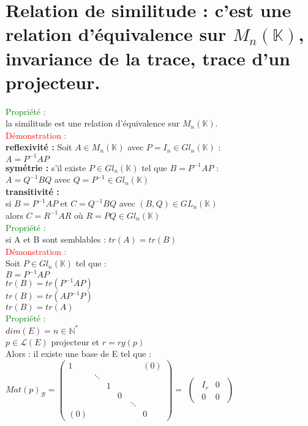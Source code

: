 \documentclass{article}
\begin{document}
        \section{Relation de similitude : c'est une relation d'équivalence sur $M_n( \mathbb K)$, invariance de la trace, trace d'un projecteur.}
				\textcolor{green}{Propriété :} \\
				la similitude est une relation d'équivalence sur $M_n(\mathbb K)$. \\
				\textcolor{red}{Démonstration :} \\
				{\bf reflexivité :} Soit $A \in M_n(\mathbb K)$ avec $P=I_n \in Gl_n(\mathbb K)$ : \\
				$A=P^{-1}A P$ \\
				{\bf symétrie :} s'il existe $P \in Gl_n(\mathbb K)$ tel que $B=P^{-1}A P$ : \\
				 $A=Q^{-1}B Q$ avec $Q=P^{-1} \in Gl_n(\mathbb K)$ \\
				 {\bf transitivité :} \\
				 si $B=P^{-1}AP$ et $C=Q^{-1}BQ$ avec $(B,Q) \in GL_n(\mathbb K)$ \\
				 alors $C=R^{-1}AR$ où $R=PQ \in Gl_n(\mathbb K)$ \\
				 \textcolor{green}{Propriété :} \\
				  si A et B sont semblables : $tr(A)=tr(B)$ \\
				 \textcolor{red}{Démonstration :} \\
				 Soit $P \in Gl_n(\mathbb K)$ tel que : \\
				 $B=P^{-1}A P$ \\
				 $tr(B)=tr(P^{-1}A P)$ \\
				 $tr(B)=tr(A P^{-1}P)$ \\
				 $tr(B)=tr(A)$ \\
				 \textcolor{green}{Propriété :} \\
				 $dim(E)=n \in \mathbb N^*$ \\
				 $p \in \mathcal L (E)$ projecteur  et $r=rg(p)$ \\
				 Alors : il existe une base de E tel que : \\
				 $Mat(p)_{\mathcal B}= \begin{pmatrix} 1 &  &  & & &(0) \\ & \ddots \\
				 & & 1 \\ & & &0 \\
				 & & & &\ \ddots \\ (0)& & & & &0 \end{pmatrix}=$ $\begin{pmatrix}\begin{array}{c|c}I _r& 0 \\ \hline0 & 0 \end{array}\end{pmatrix}$
\end{document}
